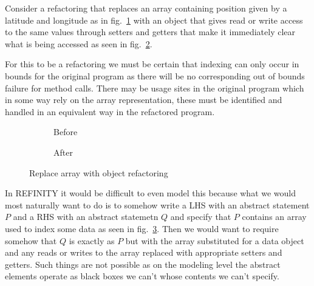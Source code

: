 Consider a refactoring that replaces an array containing position given by a latitude and longitude as in fig.~\ref{refa:ReplaceArray-before} with an object that gives read or write access to the same values through setters and getters that make it immediately clear what is being accessed as seen in fig.~\ref{refa:ReplaceArray-after}.

For this to be a refactoring we must be certain that indexing can only occur in bounds for the original program as there will be no corresponding out of bounds failure for method calls. There may be usage sites in the original program which in some way rely on the array representation, these must be identified and handled in an equivalent way in the refactored program.

\begin{figure}
  \begin{subfigure}[h]{.45\linewidth} 
    
    \caption{Before}
    \label{refa:ReplaceArray-before}   
  \end{subfigure}\hspace{1cm}
  \begin{subfigure}[h]{.45\linewidth}
    
    \caption{After}
    \label{refa:ReplaceArray-after}
  \end{subfigure}
  \caption{Replace array with object refactoring}
  \label{refa:ReplaceArray}
\end{figure}

In REFINITY it would be difficult to even model this because what we would most naturally want to do is to somehow write a LHS with an abstract statement $P$ and a RHS with an abstract statemetn $Q$ and specify that $P$ contains an array used to index some data as seen in fig.~\ref{refa:ReplaceArray}. Then we would want to require somehow that $Q$ is exactly as $P$ but with the array substituted for a data object and any reads or writes to the array replaced with appropriate setters and getters. Such things are not possible as on the modeling level the abstract elements operate as black boxes we can't whose contents we can't specify. 
